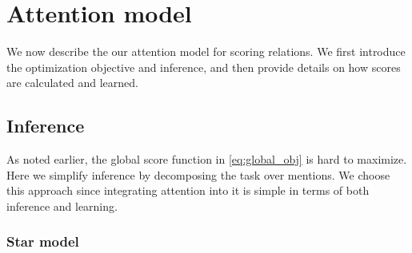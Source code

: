 \section{Attention model}
\label{sec:attention}

We now describe the our attention model for scoring relations. We first introduce the optimization objective and inference, and then provide details on how scores are calculated and learned.

\subsection{Inference}
As noted earlier, the global score function in \eqref{eq:global_obj} is hard to maximize.
Here we simplify inference by decomposing the task over mentions. 
We choose this approach since integrating attention into it is simple in terms of both inference and learning.




\subsubsection{Star model}

